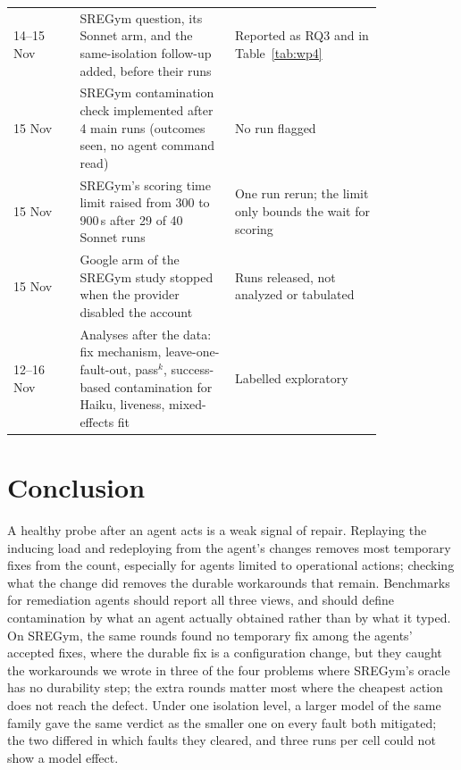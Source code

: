\begin{table}[t]
\begin{tabular}{@{}l>{\raggedright\arraybackslash}p{0.42\linewidth}>{\raggedright\arraybackslash}p{0.40\linewidth}@{}}
14--15 Nov & SREGym question, its Sonnet arm, and the same-isolation follow-up added, before their runs & Reported as RQ3
and in Table~\ref{tab:wp4} \\
15 Nov & SREGym contamination check implemented after 4 main runs (outcomes seen, no agent command read) & No run
flagged \\
15 Nov & SREGym's scoring time limit raised from 300 to 900\,s after 29 of 40 Sonnet runs & One run rerun; the limit only
bounds the wait for scoring \\
15 Nov & Google arm of the SREGym study stopped when the provider disabled the account & Runs released, not analyzed or
tabulated \\
12--16 Nov & Analyses after the data: fix mechanism, leave-one-fault-out, pass$^k$, success-based contamination for
Haiku, liveness, mixed-effects fit & Labelled exploratory \\
\bottomrule
\end{tabular}
\end{table}

\section{Conclusion}

A healthy probe after an agent acts is a weak signal of repair. Replaying the inducing load and redeploying from the agent's
changes removes most temporary fixes from the count, especially for agents limited to operational actions; checking what
the change did removes the durable workarounds that remain. Benchmarks for remediation agents should report all three
views, and should define contamination by what an agent actually obtained rather than by what it typed.
On SREGym, the same rounds found no temporary fix among the agents' accepted fixes, where the durable fix is a
configuration change, but they caught the workarounds we wrote in three of the four problems where SREGym's oracle has
no durability step; the extra rounds matter most where the cheapest action does not reach the defect.
Under one isolation level, a larger model of the same family gave the same verdict as the smaller one on every fault
both mitigated; the two differed in which faults they cleared, and three runs per cell could not show a model effect.
